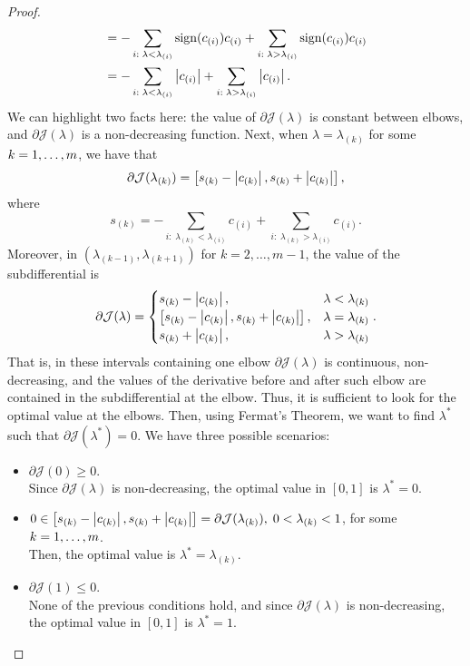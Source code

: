 \begin{proof}
\begin{equation}
\begin{aligned}
            &= - \sum_{i: \; \lambda < \lambda_{(i)}} \operatorname{sign}(c_{(i)}) {c_{(i)}} + \sum_{i: \; \lambda > \lambda_{(i)}} \operatorname{sign}(c_{(i)}) {c_{(i)}} \\
            &= - \sum_{i: \; \lambda < \lambda_{(i)}} \left|c_{(i)}\right| + \sum_{i: \; \lambda > \lambda_{(i)}} \left|c_{(i)}\right| .
        \end{aligned}        
    \end{equation}
    We can highlight two facts here: the value of $\partial \mathcal{J}(\lambda)$ is constant between elbows, and $\partial \mathcal{J}(\lambda)$ is a non-decreasing function.
    Next, when $\lambda = \lambda_{(k)}$ for some $k=1, \ldots, m$, we have that
    \begin{equation}
        \nonumber
        \partial \mathcal{J}(\lambda_{(k)}) = \left[ s_{(k)} - \left|c_{(k)}\right|, s_{(k)} + \left|c_{(k)}\right|   \right] ,
    \end{equation}
    where $$s_{(k)} = - \sum_{i: \; \lambda_{(k)} < \lambda_{(i)}} c_{(i)} + \sum_{i: \; \lambda_{(k)} > \lambda_{(i)}} c_{(i)}.$$
    Moreover, in $(\lambda_{(k-1)}, \lambda_{(k+1)})$ for $k=2, \ldots, m-1$, the value of the subdifferential is
    \begin{equation}
        \nonumber
        \partial \mathcal{J}(\lambda) = \begin{cases}
            s_{(k)} - \left|c_{(k)}\right|,& \lambda < \lambda_{(k)}\\
            \left[ s_{(k)} - \left|c_{(k)}\right|, s_{(k)} + \left|c_{(k)}\right|   \right],& \lambda = \lambda_{(k)} \\
            s_{(k)} + \left|c_{(k)}\right|,& \lambda > \lambda_{(k)}
        \end{cases} .
    \end{equation}
    That is, in these intervals containing one elbow  $\partial \mathcal{J}(\lambda)$ is continuous, non-decreasing, and the values of the derivative before and after such elbow are contained in the subdifferential at the elbow. Thus, it is sufficient to look for the optimal value at the elbows.
    Then, using Fermat's Theorem, we want to find $\lambda^*$ such that $\partial \mathcal{J}(\lambda^*) = 0$. We have three possible scenarios:
    \begin{itemize}
        \item $\partial \mathcal{J}(0) \geq 0.$ 
        \\Since $\partial \mathcal{J}(\lambda)$ is non-decreasing, the optimal value in $[0, 1]$ is $\lambda^* = 0$.
        \item $0 \in \left[ s_{(k)} - \left|c_{(k)}\right|, s_{(k)} + \left|c_{(k)}\right|   \right] = \partial \mathcal{J}(\lambda_{(k)}), \; 0 < \lambda_{(k)} < 1$, for some $k=1, \ldots, m$. 
        \\Then, the optimal value is $\lambda^*=\lambda_{(k)}$.
        \item $\partial \mathcal{J}(1) \leq 0$. 
        \\None of the previous conditions hold, and since $\partial \mathcal{J}(\lambda)$ is non-decreasing, the optimal value in $[0, 1]$ is $\lambda^* = 1$.
    \end{itemize}
\end{proof}
